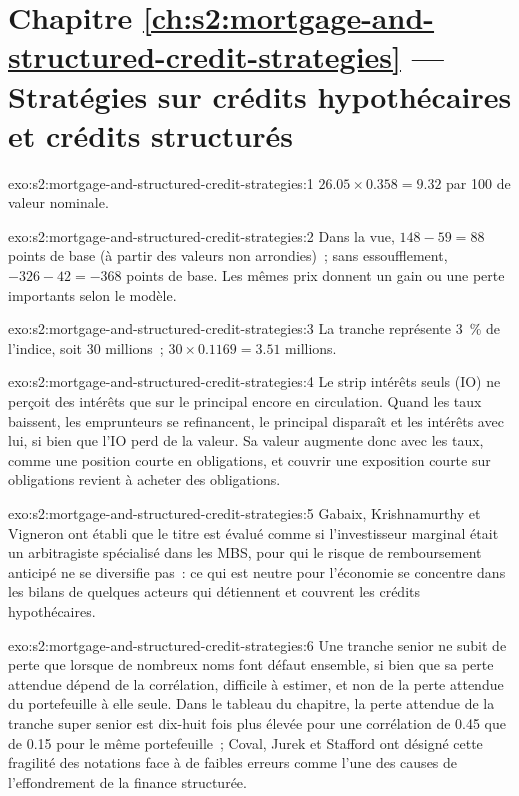 \section*{Chapitre \ref{ch:s2:mortgage-and-structured-credit-strategies} --- Stratégies sur crédits hypothécaires et crédits structurés}

\begin{solution}{exo:s2:mortgage-and-structured-credit-strategies:1}
$26.05 \times 0.358 = 9.32$ par 100 de valeur nominale.
\end{solution}

\begin{solution}{exo:s2:mortgage-and-structured-credit-strategies:2}
Dans la vue, $148 - 59 = 88$ points de base (à partir des valeurs non arrondies)~; sans essoufflement, $-326 - 42 = -368$ points de base. Les mêmes prix donnent un
gain ou une perte importants selon le modèle.
\end{solution}

\begin{solution}{exo:s2:mortgage-and-structured-credit-strategies:3}
La tranche représente 3~\% de l'indice, soit 30 millions~; $30 \times 0.1169 = 3.51$ millions.
\end{solution}

\begin{solution}{exo:s2:mortgage-and-structured-credit-strategies:4}
Le strip intérêts seuls (IO) ne perçoit des intérêts que sur le principal encore en circulation. Quand les taux baissent, les emprunteurs se refinancent, le principal disparaît et les intérêts
avec lui, si bien que l'IO perd de la valeur. Sa valeur augmente donc avec les taux, comme une position courte en obligations, et couvrir une exposition courte sur obligations revient à acheter des obligations.
\end{solution}

\begin{solution}{exo:s2:mortgage-and-structured-credit-strategies:5}
Gabaix, Krishnamurthy et Vigneron ont établi que le titre est évalué comme si l'investisseur marginal était un arbitragiste spécialisé dans les MBS, pour qui le risque de remboursement anticipé ne
se diversifie pas~: ce qui est neutre pour l'économie se concentre dans les bilans de quelques acteurs qui détiennent et couvrent les crédits hypothécaires.
\end{solution}

\begin{solution}{exo:s2:mortgage-and-structured-credit-strategies:6}
Une tranche senior ne subit de perte que lorsque de nombreux noms font défaut ensemble, si bien que sa perte attendue dépend de la corrélation, difficile à estimer, et non de la
perte attendue du portefeuille à elle seule. Dans le tableau du chapitre, la perte attendue de la tranche super senior est dix-huit fois plus élevée pour une corrélation de 0.45 que
de 0.15 pour le même portefeuille~; Coval, Jurek et Stafford ont désigné cette fragilité des notations face à de faibles erreurs comme l'une des causes de l'effondrement de la
finance structurée.
\end{solution}

